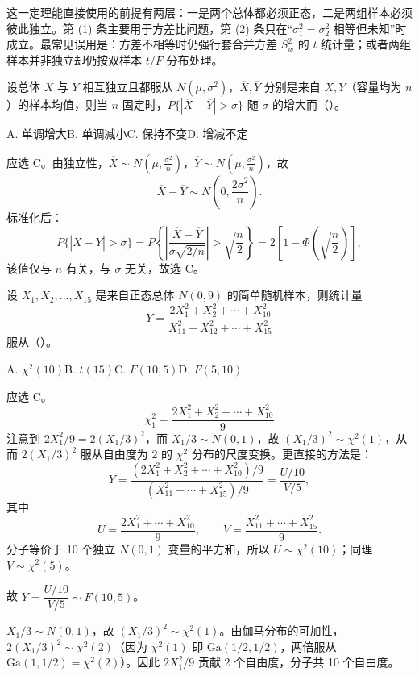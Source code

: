 ﻿\documentclass[lang=cn,11pt]{elegantbook}
\begin{document}
\begin{note}
这一定理能直接使用的前提有两层：一是两个总体都必须正态，二是两组样本必须彼此独立。第 (1) 条主要用于方差比问题，第 (2) 条只在“\(\sigma_1^2=\sigma_2^2\) 相等但未知”时成立。最常见误用是：方差不相等时仍强行套合并方差 \(S_w^2\) 的 \(t\) 统计量；或者两组样本并非独立却仍按双样本 \(t/F\) 分布处理。
\end{note}

\begin{exercise}[样本均值差的分布] \label{ex:sampling_02}
设总体 \(X\) 与 \(Y\) 相互独立且都服从 \(N(\mu,\sigma^2)\)，\(\overline{X},\overline{Y}\) 分别是来自 \(X,Y\)（容量均为 \(n\)）的样本均值，则当 \(n\) 固定时，\(P\{|\overline{X}-\overline{Y}|>\sigma\}\) 随 \(\sigma\) 的增大而（\quad）。\par
A. 单调增大\qquad B. 单调减小\qquad C. 保持不变\qquad D. 增减不定
\end{exercise}
\begin{solution}
应选 C。由独立性，\(\overline{X}\sim N\!\left(\mu,\frac{\sigma^2}{n}\right)\)，\(\overline{Y}\sim N\!\left(\mu,\frac{\sigma^2}{n}\right)\)，故
\[
\overline{X}-\overline{Y}\sim N\!\left(0,\frac{2\sigma^2}{n}\right).
\]
标准化后：
\[
P\{|\overline{X}-\overline{Y}|>\sigma\}
= P\!\left\{\left|\frac{\overline{X}-\overline{Y}}{\sigma\sqrt{2/n}}\right|>\sqrt{\frac{n}{2}}\right\}
= 2\!\left[1-\Phi\!\left(\sqrt{\frac{n}{2}}\right)\right],
\]
该值仅与 \(n\) 有关，与 \(\sigma\) 无关，故选 C。
\end{solution}


\begin{exercise}\label{exer:6-y-f-dist}
设 \(X_1, X_2, \dots, X_{15}\) 是来自正态总体 \(N(0, 9)\) 的简单随机样本，则统计量
\[
Y = \frac{2X_1^2 + X_2^2 + \cdots + X_{10}^2}{X_{11}^2 + X_{12}^2 + \cdots + X_{15}^2}
\]
服从（\quad）。\par
A. \(\chi^2(10)\)\quad B. \(t(15)\)\quad C. \(F(10,5)\)\quad D. \(F(5,10)\)
\end{exercise}

\begin{solution}
应选 C。
\[
\chi_1^2 = \frac{2X_1^2+X_2^2+\cdots+X_{10}^2}{9}
\]
注意到 \(2X_1^2/9 = 2(X_1/3)^2\)，而 \(X_1/3 \sim N(0,1)\)，故 \((X_1/3)^2 \sim \chi^2(1)\)，从而 \(2(X_1/3)^2\) 服从自由度为 2 的 \(\chi^2\) 分布的尺度变换。更直接的方法是：
\[
Y = \frac{(2X_1^2+X_2^2+\cdots+X_{10}^2)/9}{(X_{11}^2+\cdots+X_{15}^2)/9} = \frac{U/10}{V/5},
\]
其中
\[
U = \dfrac{2X_1^2+\cdots+X_{10}^2}{9},\qquad
V = \dfrac{X_{11}^2+\cdots+X_{15}^2}{9}.
\]
分子等价于 10 个独立 \(N(0,1)\) 变量的平方和，所以 \(U \sim \chi^2(10)\)；同理 \(V \sim \chi^2(5)\)。

故 \(Y = \dfrac{U/10}{V/5} \sim F(10, 5)\)。

\begin{note}
\(X_1/3 \sim N(0,1)\)，故 \((X_1/3)^2 \sim \chi^2(1)\)。由伽马分布的可加性，\(2(X_1/3)^2 \sim \chi^2(2)\)（因为 \(\chi^2(1)\) 即 \(\text{Ga}(1/2,1/2)\)，两倍服从 \(\text{Ga}(1,1/2)=\chi^2(2)\)）。因此 \(2X_1^2/9\) 贡献 2 个自由度，分子共 10 个自由度。
\end{note}
\end{solution}
\end{document}
